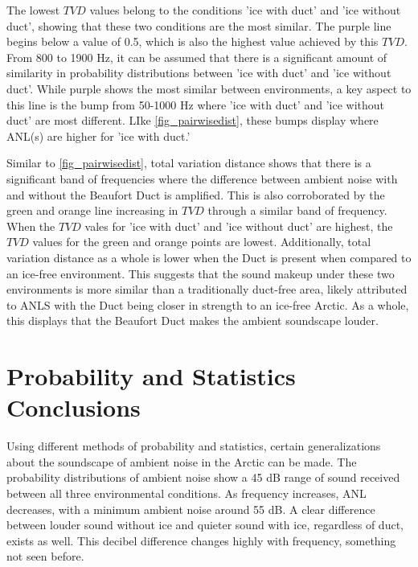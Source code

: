 The lowest $TVD$ values belong to the conditions 'ice with duct' and 'ice without duct', showing that these two conditions are the most similar. The purple line begins below a value of 0.5, which is also the highest value achieved by this $TVD$. From 800 to 1900 Hz, it can be assumed that there is a significant amount of similarity in probability distributions between 'ice with duct' and 'ice without duct'. While purple shows the most similar between environments, a key aspect to this line is the bump from 50-1000 Hz where 'ice with duct' and 'ice without duct' are most different. LIke \autoref{fig_pairwisedist}, these bumps display where ANL(s) are higher for 'ice with duct.'


Similar to \autoref{fig_pairwisedist}, total variation distance shows that there is a significant band of frequencies where the difference between ambient noise with and without the Beaufort Duct is amplified. This is also corroborated by the green and orange line increasing in $TVD$ through a similar band of frequency. When the $TVD$ vales for 'ice with duct' and 'ice without duct' are highest, the $TVD$ values for the green and orange points are lowest. Additionally, total variation distance as a whole is lower when the Duct is present when compared to an ice-free environment. This suggests that the sound makeup under these two environments is more similar than a traditionally duct-free area, likely attributed to ANLS with the Duct being closer in strength to an ice-free Arctic. As a whole, this displays that the Beaufort Duct makes the ambient soundscape louder.




\section{Probability and Statistics Conclusions}
Using different methods of probability and statistics, certain generalizations about the soundscape of ambient noise in the Arctic can be made. The probability distributions of ambient noise show a 45 dB range of sound received between all three environmental conditions. As frequency increases, ANL decreases, with a minimum ambient noise around 55 dB. A clear difference between louder sound without ice and quieter sound with ice, regardless of duct, exists as well. This decibel difference changes highly with frequency, something not seen before.

